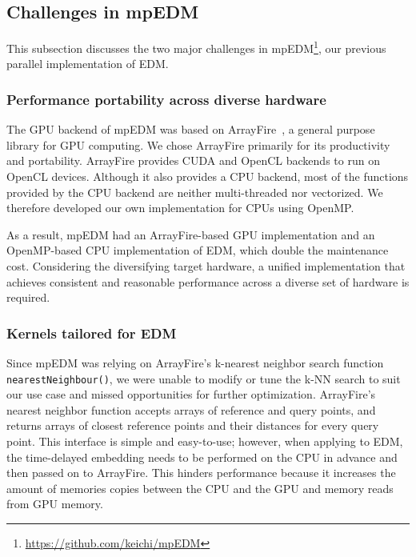 \documentclass[sigconf]{acmart}
\begin{document}
\subsection{Challenges in mpEDM}\label{sec:challenges}

This subsection discusses the two major challenges in
mpEDM\footnote{\url{https://github.com/keichi/mpEDM}}, our previous
parallel implementation of EDM\@.

\subsubsection{Performance portability across diverse hardware}\label{sec:portability}

The GPU backend of mpEDM was based on ArrayFire~\cite{Malcolm2012}, a general
purpose library for GPU computing. We chose ArrayFire primarily for its
productivity and portability. ArrayFire provides CUDA and OpenCL backends to
run on OpenCL devices. Although it also provides a CPU backend, most of the
functions provided by the CPU backend are neither multi-threaded nor
vectorized. We therefore developed our own implementation for CPUs
using OpenMP\@.

As a result, mpEDM had an ArrayFire-based GPU implementation and an OpenMP-based
CPU implementation of EDM, which double the maintenance cost. Considering the
diversifying target hardware, a unified implementation that achieves
consistent and reasonable performance across a diverse set of hardware is
required.

\subsubsection{Kernels tailored for EDM}\label{sec:flexibility}

Since mpEDM was relying on ArrayFire's k-nearest neighbor search function \texttt{nearestNeighbour()}, we were unable to modify or tune the k-NN
search to suit our use case and missed opportunities for further optimization.
ArrayFire's nearest neighbor function accepts arrays of reference and query
points, and returns arrays of closest reference points and their distances
for every query point. This interface is simple and easy-to-use; however, when
applying to EDM, the time-delayed embedding needs to be performed on the CPU in
advance and then passed on to ArrayFire. This hinders performance because it
increases the amount of memories copies between the CPU and the
GPU and memory reads from GPU memory.
\end{document}
